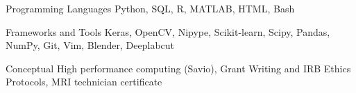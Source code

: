 

\begin{cvskills}

 \cvskill
  	{Programming Languages}
    {Python, SQL, R, MATLAB, HTML, Bash} %
  
 \cvskill
   {Frameworks and Tools}
   {Keras, OpenCV, Nipype, Scikit-learn, Scipy, Pandas, NumPy, Git, Vim, Blender, Deeplabcut}
   
 \cvskill
   {Conceptual}
   {High performance computing (Savio), Grant Writing and IRB Ethics Protocols, MRI technician certificate}
   
    

\end{cvskills}
